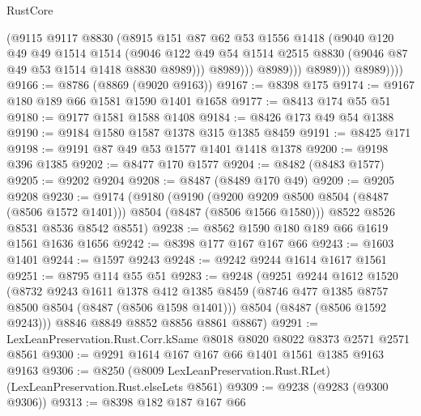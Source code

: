 \begin{lexlean}{RustCore}
\begin{coremodule}
                          (@9115
                            @9117
                            @8830
                            (@8915
                              @151
                              @87
                              @62
                              @53
                              @1556
                              @1418
                              (@9040
                                @120
                                @49
                                @49
                                @1514
                                @1514
                                (@9046
                                  @122
                                  @49
                                  @54
                                  @1514
                                  @2515
                                  @8830
                                  (@9046 @87 @49 @53 @1514 @1418 @8830 @8989)))
                              @8989)))
                        @8989)))
                  @8989)))
            @8989))))
@9166 := @8786 (@8869 (@9020 @9163))
@9167 := @8398 @175
@9174 := @9167 @180 @189 @66 @1581 @1590 @1401 @1658
@9177 := @8413 @174 @55 @51
@9180 := @9177 @1581 @1588 @1408
@9184 := @8426 @173 @49 @54 @1388
@9190 := @9184 @1580 @1587 @1378 @315 @1385 @8459
@9191 := @8425 @171
@9198 := @9191 @87 @49 @53 @1577 @1401 @1418 @1378
@9200 := @9198 @396 @1385
@9202 := @8477 @170 @1577
@9204 := @8482 (@8483 @1577)
@9205 := @9202 @9204
@9208 := @8487 (@8489 @170 @49)
@9209 := @9205 @9208
@9230 := @9174
    (@9180
      (@9190
        (@9200 @9209 @8500 @8504 (@8487 (@8506 @1572 @1401)))
        @8504
        (@8487 (@8506 @1566 @1580)))
      @8522
      @8526
      @8531
      @8536
      @8542
      @8551)
@9238 := @8562 @1590 @180 @189 @66 @1619 @1561 @1636 @1656
@9242 := @8398 @177 @167 @167 @66
@9243 := @1603 @1401
@9244 := @1597 @9243
@9248 := @9242 @9244 @1614 @1617 @1561
@9251 := @8795 @114 @55 @51
@9283 := @9248
    (@9251
      @9244
      @1612
      @1520
      (@8732
        @9243
        @1611
        @1378
        @412
        @1385
        @8459
        (@8746 @477 @1385 @8757 @8500 @8504 (@8487 (@8506 @1598 @1401)))
        @8504
        (@8487 (@8506 @1592 @9243)))
      @8846
      @8849
      @8852
      @8856
      @8861
      @8867)
@9291 := LexLeanPreservation.Rust.Corr.kSame @8018 @8020 @8022 @8373 @2571 @2571 @8561
@9300 := @9291 @1614 @167 @167 @66 @1401 @1561 @1385 @9163 @9163
@9306 := @8250 (@8009 LexLeanPreservation.Rust.RLet) (LexLeanPreservation.Rust.elseLets @8561)
@9309 := @9238 (@9283 (@9300 @9306))
@9313 := @8398 @182 @187 @167 @66

\end{coremodule}
\end{lexlean}
